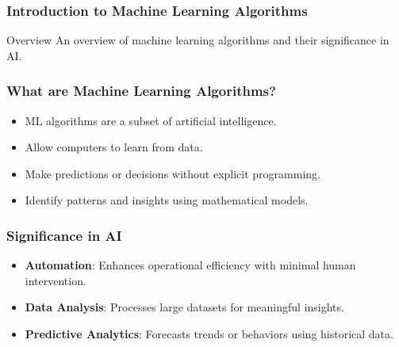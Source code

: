 \documentclass[aspectratio=169]{beamer}
\begin{document}
\frame{\titlepage}

\begin{frame}[fragile]
    \frametitle{Introduction to Machine Learning Algorithms}
    \begin{block}{Overview}
        An overview of machine learning algorithms and their significance in AI.
    \end{block}
\end{frame}

\begin{frame}[fragile]
    \frametitle{What are Machine Learning Algorithms?}
    \begin{itemize}
        \item ML algorithms are a subset of artificial intelligence.
        \item Allow computers to learn from data.
        \item Make predictions or decisions without explicit programming.
        \item Identify patterns and insights using mathematical models.
    \end{itemize}
\end{frame}

\begin{frame}[fragile]
    \frametitle{Significance in AI}
    \begin{itemize}
        \item \textbf{Automation}: Enhances operational efficiency with minimal human intervention.
        \item \textbf{Data Analysis}: Processes large datasets for meaningful insights.
        \item \textbf{Predictive Analytics}: Forecasts trends or behaviors using historical data.
    \end{itemize}
\end{frame}
\end{document}
